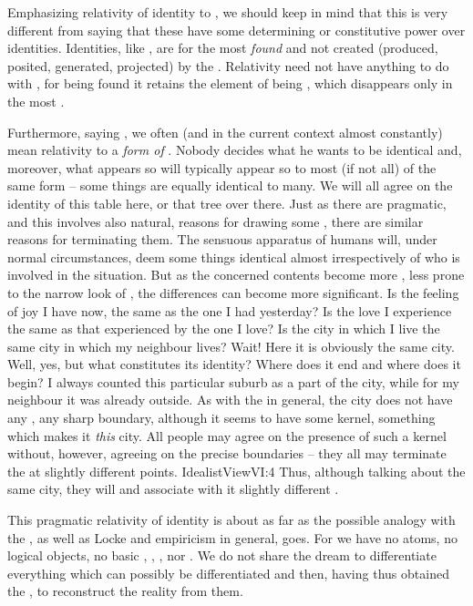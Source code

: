 Emphasizing relativity of identity to , we should keep in mind
that this is very different from saying that these  have some
determining or constitutive power over identities. Identities, like
, are for the most {\em found} and not created (produced,
posited, generated, projected) by the . Relativity need not have
anything to do with , for being found it retains the element
of being , which disappears only in the most .

Furthermore, saying , we often (and in the
current context almost constantly) mean relativity to a {\em form of}
.  Nobody decides what he wants to be identical and, moreover,
what appears so will typically appear so to most (if not all)  of
the same form -- some things are equally identical to many. We will all agree on
the identity of this table here, or that tree over there. Just as there are
pragmatic, and this involves also natural, reasons for drawing some
, there are similar reasons for terminating them. The sensuous
apparatus of humans will, under normal circumstances, deem some things identical
almost irrespectively of who  is involved in the situation. But as
the concerned contents become more , less prone to the narrow look of
, the differences can become more significant. Is the feeling of
joy I have now, the same as the one I had yesterday? Is the love I experience
the same as that experienced by the one I love? Is the city in which I live the
same city in which my neighbour lives? Wait! Here it is obviously the same city.
Well, yes, but what constitutes its identity? Where does it end and where does
it begin? I always counted this particular suburb as a part of the city, while
for my neighbour it was already outside. As with the  in
general, the city does not have any , any sharp boundary, although
it seems to have some kernel, something which makes it {\em this} city. All
people may agree on the presence of such a kernel without, however, agreeing on
the precise boundaries -- they all may terminate the  at
slightly different points. \citet{There are no sharp divisions of 
  reality.}{IdealistView}{VI:4} Thus, although talking
about the same city, they will  and associate with it slightly
different .

\pa This pragmatic relativity of identity is about as far as the possible
analogy with the , as well as Locke and empiricism
in general, goes. For we have no atoms, no logical objects, no basic ,
, , nor . We do not share the
dream to differentiate everything which can possibly be differentiated and
then, having thus obtained the , to reconstruct the reality from
them.

